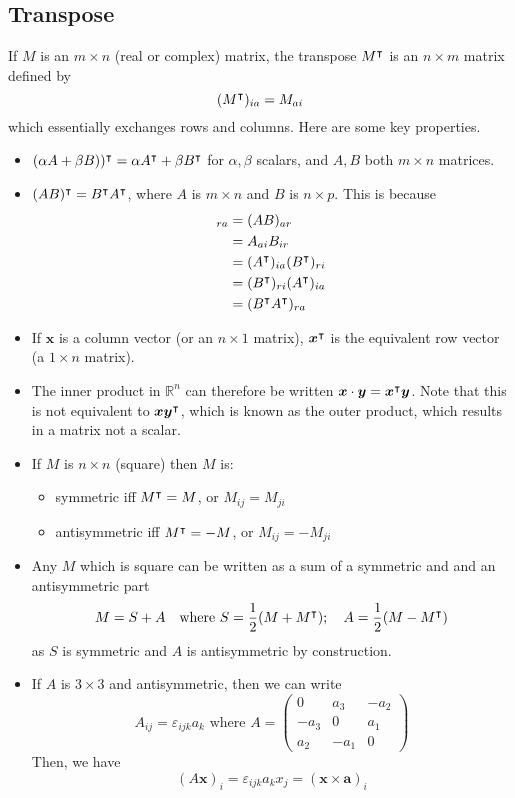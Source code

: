 \documentclass{article}
\begin{document}
\subsection{Transpose}
If $M$ is an $m \times n$ (real or complex) matrix, the transpose $M^\intercal$ is an $n \times m$ matrix defined by
\[ (M^\intercal)_{ia} = M_{ai} \]
which essentially exchanges rows and columns. Here are some key properties.
\begin{itemize}
	\item $(\alpha A + \beta B))^\intercal = \alpha A^\intercal + \beta B^\intercal$ for $\alpha, \beta$ scalars, and $A, B$ both $m \times n$ matrices.
	\item $(AB)^\intercal = B^\intercal A^\intercal$, where $A$ is $m \times n$ and $B$ is $n \times p$. This is because
	      \begin{align*}
		      [(AB)^\transpose]_{ra} & = (AB)_{ar}                               \\
		                             & = A_{ai} B_{ir}                           \\
		                             & = (A^\transpose)_{ia} (B^\transpose)_{ri} \\
		                             & = (B^\transpose)_{ri} (A^\transpose)_{ia} \\
		                             & = (B^\transpose A^\transpose)_{ra}
	      \end{align*}
	\item If $\bm x$ is a column vector (or an $n \times 1$ matrix), $\bm x^\intercal$ is the equivalent row vector (a $1 \times n$ matrix).
	\item The inner product in $\mathbb R^n$ can therefore be written $\bm x \cdot \bm y = \bm x^\intercal \bm y$. Note that this is not equivalent to $\bm x \bm y^\intercal$, which is known as the outer product, which results in a matrix not a scalar.
	\item If $M$ is $n \times n$ (square) then $M$ is:
	      \begin{itemize}
		      \item symmetric iff $M^\intercal = M$, or $M_{ij} = M_{ji}$
		      \item antisymmetric iff $M^\intercal = -M$, or $M_{ij} = -M_{ji}$
	      \end{itemize}
	\item Any $M$ which is square can be written as a sum of a symmetric and and an antisymmetric part
	      \[ M = S + A\quad\text{where } S = \frac{1}{2}(M + M^\intercal);\quad A = \frac{1}{2}(M - M^\intercal) \]
	      as $S$ is symmetric and $A$ is antisymmetric by construction.
	\item If $A$ is $3 \times 3$ and antisymmetric, then we can write
	      \[ A_{ij} = \varepsilon_{ijk}a_k\text{ where } A = \begin{pmatrix}
			      0    & a_3  & -a_2 \\
			      -a_3 & 0    & a_1  \\
			      a_2  & -a_1 & 0
		      \end{pmatrix} \]
	      Then, we have
	      \[
		      (A \bm x)_i = \varepsilon_{ijk}a_k x_j = (\bm x \times \bm a)_i
	      \]
\end{itemize}
\end{document}
